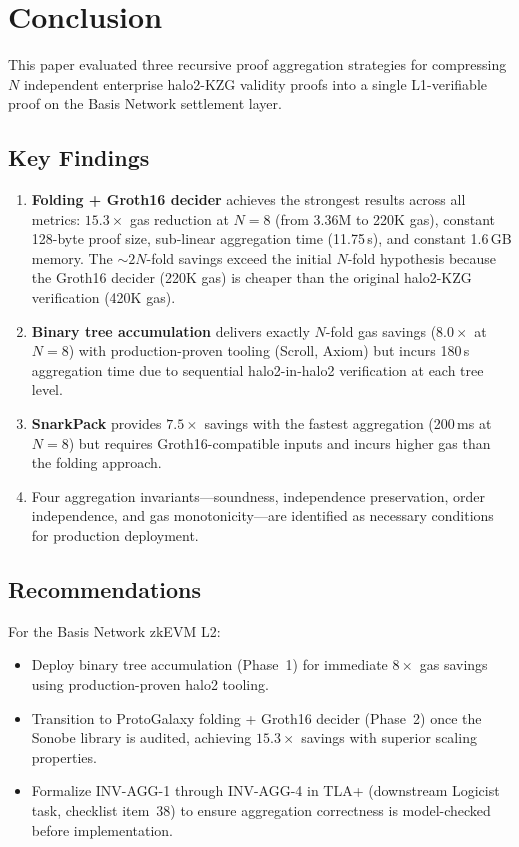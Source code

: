 \section{Conclusion}
\label{sec:conclusion}

This paper evaluated three recursive proof aggregation strategies for
compressing $N$ independent enterprise halo2-KZG validity proofs into a
single L1-verifiable proof on the Basis Network settlement layer.

\subsection{Key Findings}

\begin{enumerate}
  \item \textbf{Folding + Groth16 decider} achieves the strongest
    results across all metrics: $15.3\times$ gas reduction at $N{=}8$
    (from 3.36M to 220K gas), constant 128-byte proof size, sub-linear
    aggregation time (11.75\,s), and constant 1.6\,GB memory. The
    ${\sim}2N$-fold savings exceed the initial $N$-fold hypothesis
    because the Groth16 decider (220K gas) is cheaper than the original
    halo2-KZG verification (420K gas).

  \item \textbf{Binary tree accumulation} delivers exactly $N$-fold gas
    savings ($8.0\times$ at $N{=}8$) with production-proven tooling
    (Scroll, Axiom) but incurs 180\,s aggregation time due to sequential
    halo2-in-halo2 verification at each tree level.

  \item \textbf{SnarkPack} provides $7.5\times$ savings with the fastest
    aggregation (200\,ms at $N{=}8$) but requires Groth16-compatible
    inputs and incurs higher gas than the folding approach.

  \item Four aggregation invariants---soundness, independence
    preservation, order independence, and gas monotonicity---are
    identified as necessary conditions for production deployment.
\end{enumerate}

\subsection{Recommendations}

For the Basis Network zkEVM L2:

\begin{itemize}
  \item Deploy binary tree accumulation (Phase~1) for immediate
    $8\times$ gas savings using production-proven halo2 tooling.
  \item Transition to ProtoGalaxy folding + Groth16 decider (Phase~2)
    once the Sonobe library is audited, achieving $15.3\times$ savings
    with superior scaling properties.
  \item Formalize INV-AGG-1 through INV-AGG-4 in TLA+ (downstream
    Logicist task, checklist item~38) to ensure aggregation correctness
    is model-checked before implementation.
\end{itemize}

